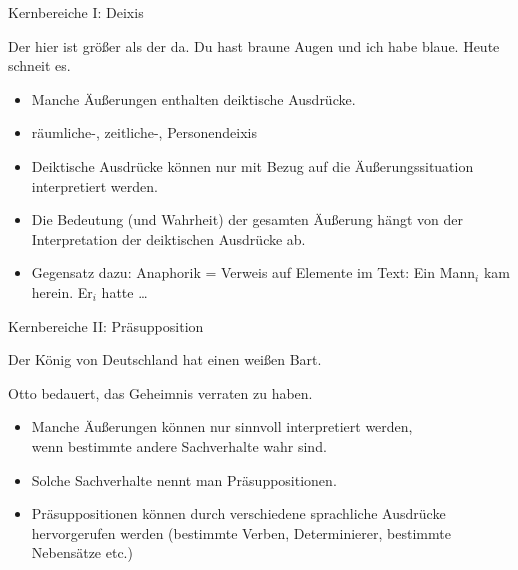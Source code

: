\begin{frame}{Kernbereiche I: Deixis}

\begin{exe}
\ex  Der \alert{hier} ist größer als der \alert{da}.
\ex  \alert{Du} hast braune Augen und \alert{ich} habe blaue.
\ex  \alert{Heute} schneit es.
\end{exe}

\pause

\begin{itemize}
\item Manche Äußerungen enthalten deiktische Ausdrücke.\pause
\item räumliche-, zeitliche-, Personendeixis\pause
\item Deiktische Ausdrücke können nur mit Bezug auf die Äußerungssituation interpretiert werden.\pause
\item Die Bedeutung (und Wahrheit) der gesamten Äußerung hängt von der Interpretation der deiktischen Ausdrücke ab.

\bigskip

\item Gegensatz dazu: Anaphorik = Verweis auf Elemente im Text:
\ea
Ein Mann$_i$ kam herein. Er$_i$ hatte \ldots
\z

\end{itemize}


\end{frame}


 \begin{frame}{Kernbereiche II: Präsupposition}

\begin{exe}     
        \ex Der König von Deutschland hat einen weißen Bart.\\


        \ex Otto bedauert, das Geheimnis verraten zu haben.\\


\end{exe}



\begin{itemize}
\item Manche Äußerungen können nur sinnvoll interpretiert werden,\\
      wenn bestimmte andere Sachverhalte wahr sind.\pause
\item Solche Sachverhalte nennt man \alert{Präsuppositionen}. \pause
\item Präsuppositionen können durch verschiedene sprachliche Ausdrücke hervorgerufen werden (bestimmte Verben, Determinierer, bestimmte Nebensätze etc.)
\end{itemize}

\end{frame}




